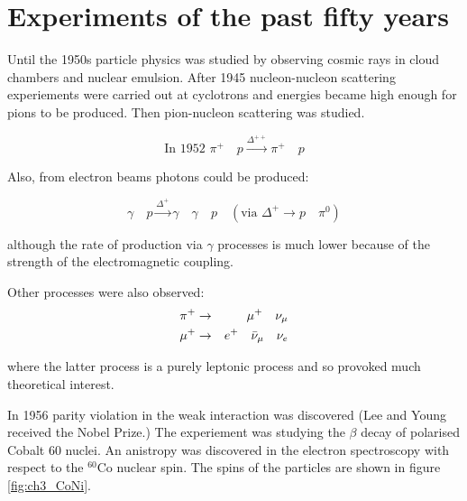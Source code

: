 \chapter{Experiments of the past fifty years}

Until the 1950s particle physics was studied by observing cosmic rays in cloud chambers and nuclear emulsion.  After 1945 nucleon-nucleon scattering experiements were carried out at cyclotrons and energies became high enough for pions to be produced.  Then pion-nucleon scattering was studied.

\[
  \textrm{In 1952 } \pi^+ \quad p \stackrel{\Delta^{++}}{\to} \pi^+ \quad p
\]

Also, from electron beams photons could be produced:

\[
  \gamma \quad p \stackrel{\Delta^+}{\to} \gamma \quad \gamma \quad p \quad (\textrm{via } \Delta^+ \to p \quad \pi^0 )
\]

although the rate of production via $\gamma$ processes is much lower because of the strength of the electromagnetic coupling.

Other processes were also observed:
\begin{eqnarray*}
  \pi^+ & \to & \mu^+ \quad \nu_{\mu} \\
  \mu^+ & \to & e^+ \quad \bar{\nu}_{\mu} \quad \nu_e
\end{eqnarray*}

where the latter process is a purely leptonic process and so provoked much theoretical interest.

In 1956 parity violation in the weak interaction was discovered (Lee and Young received the Nobel Prize.)  The experiement was studying the $\beta$ decay of polarised Cobalt $60$ nuclei.  An anistropy was discovered in the electron spectroscopy with respect to the $^{60}\textrm{Co}$ nuclear spin. The spins of the particles are shown in figure \ref{fig:ch3_CoNi}.

